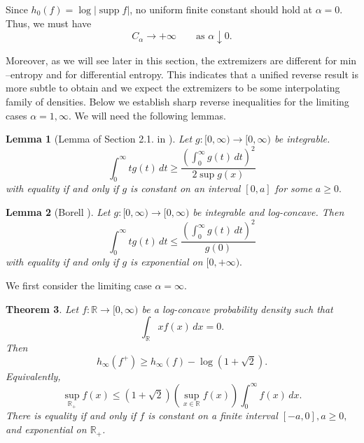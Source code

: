 \documentclass{article}
\theoremstyle{plain}
\newtheorem{theorem}{Theorem}
\newtheorem{lemma}[theorem]{Lemma}
\theoremstyle{definition}
\newcommand{\1}{\mathbf 1}
\begin{document}
Since $h_0(f)=\log |\operatorname{supp} f|$, no uniform finite constant should
hold at $\alpha=0$. Thus, we must have
\[
        C_\alpha\longrightarrow +\infty
        \qquad\text{as }\alpha\downarrow 0.
\]


Moreover, as we will see later in this section, the extremizers are different for $\mathrm{min}$--entropy and for differential entropy. This indicates that a unified reverse result is more subtle to obtain and we expect the extremizers to be some interpolating family of densities. Below we establish sharp reverse inequalities for the limiting cases $\alpha=1,\infty$. We will need the following lemmas.


\begin{lemma} [Lemma of Section 2.1. in \cite{milmanisotropic}]
\label{lem:moment-lower-decreasing}
Let $g:[0,\infty)\to[0,\infty)$ be integrable. 
\[
        \int_0^\infty t g(t)\,dt
        \ge
        \frac{\left(\int_0^\infty g(t)\,dt\right)^2}{2\sup g(x)}
\]
with equality if and only if $g$ is constant on an interval $[0,a]$ for some $a \geq 0.$
\end{lemma}

\begin{lemma}[Borell \cite{borell}]
\label{lem:moment-upper-logconcave}
Let $g:[0,\infty)\to[0,\infty)$ be integrable and log-concave. 
Then
\[
        \int_0^\infty t g(t)\,dt
        \le
        \frac{\left(\int_0^\infty g(t)\,dt\right)^2}{g(0)}
\]
with equality if and only if $g$ is exponential on $[0,+\infty).$
\end{lemma}

We first consider the limiting case $\alpha=\infty$.
\begin{theorem} \label{minentropyreverseTh}
Let $f:\mathbb R\to[0,\infty)$ be a log-concave probability density such that
\[
        \int_{\mathbb R} x f(x)\,dx=0.
\]
Then
\[
        h_\infty(f^+)
        \ge
        h_\infty(f)-\log(1+\sqrt2).
\]
Equivalently,
\begin{equation} \label{sqrt2equality}
        \sup_{\mathbb R_+} f(x)
        \le
        (1+\sqrt2)
        \left(\sup_{x\in\mathbb R} f(x)\right)
        \int_0^\infty f(x)\,dx .
\end{equation}
There is equality if and only if $f$ is constant on a finite interval $[-a,0], a \geq 0,$ and exponential on $\mathbb R_+$.
\end{theorem}
\end{document}
